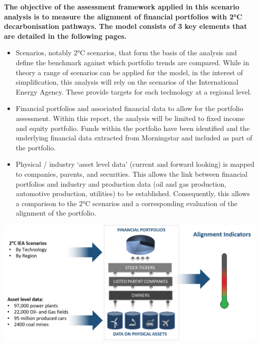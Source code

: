 \documentclass[10pt,table,a4]{article}\usepackage[]{graphicx}\usepackage[]{color}
\begin{document}
	\begin{multicols}{2}
		\textbf{The objective of the assessment framework applied in this scenario analysis is to measure the alignment of financial portfolios with 2°C decarbonisation pathways. The model consists of 3 key elements that are detailed in the following pages.}
		
		
		\begin{itemize}
			
			\item {Scenarios, notably 2°C scenarios, that form the basis of the analysis and define the benchmark against which portfolio 	trends are compared. While in theory a range of scenarios can be applied for the model, in the interest of simplification, this analysis will rely on the scenarios of the International Energy Agency. These provide targets for each technology at a regional level. }
			
			\item{Financial portfolios and associated financial data to allow for the portfolio assessment. Within this report, the analysis 	will be limited to fixed income and equity portfolio. Funds within the portfolio have been identified and the underlying financial data extracted from Morningstar and included as part of the portfolio. }
			
			\item{Physical / industry ‘asset level data’ (current and forward looking) is mapped to companies, parents, and securities. This 	allows the link between financial portfolios and industry and production data (oil and gas production, automotive production, utilities) to be established. Consequently, this allows a comparison to the 2°C scenarios and a corresponding evaluation of the alignment of the portfolio. }
			
		\end{itemize}
	\end{multicols}
	
	
	\includegraphics[trim = {0 0cm 0 0},width=1\linewidth]{ReportGraphics/SummaryChart}
	
\end{document}
